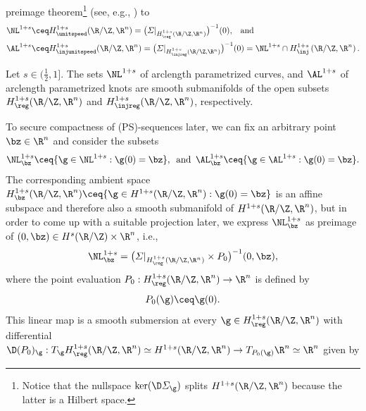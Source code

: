 preimage theorem\footnote{Notice that the nullspace $\ker(\D\varSigma_\g)$
splits $H^{1+s}(\R/\Z,\R^n)$ because the latter is a Hilbert space.}
(see, e.g., \cite[Theorem 4.J]{zeidler_1993}) 
to
\begin{equation}
\begin{aligned}
	\label{eq:arclength-manifold}
&\NL^{1+s}\ceq H^{1+s}_\unitspeed(\R/\Z,\R^n)=\big(\varSigma|_{H^{1+s}_\reg(\R/\Z,\R^n)}
\big)^{-1}(0),\hspace{5pt}\text{ and }\\
&\AL^{1+s} \ceq H^{1+s}_\injunitspeed(\R/\Z,\R^n)=\big(\varSigma|_{H^{1+s}_\injreg(\R/\Z,\R^n)}\big)^{-1}(0)=\NL^{1+s}\cap H^{1+s}_\inj\left( \R/\Z,\R^n \right).
\end{aligned}
\end{equation}

\begin{theorem}
\label{thm:arclength-manifold}
Let $s\in (\frac{1}{2},1]$.
The sets $\NL^{1+s}$ of arclength para\-met\-rized curves, and $\AL^{1+s}$ of arclength para\-met\-rized knots are smooth submanifolds
of the open subsets $H^{1+s}_\reg(\R/\Z,\R^n)$ and $ H^{1+s}_\injreg(\R/\Z,\R^n) $, respectively. 
\end{theorem}
To secure compactness of (PS)-sequences  later,
we can fix an arbitrary 
point $\bz\in\R^n$ and
consider the subsets
\begin{equation}\label{eq:arclenth-point}
\NL^{1+s}_\bz\ceq\{\g\in\NL^{1+s}:\g(0)=\bz\},\, \text{ and }\,\AL^{1+s}_\bz\ceq\{\g\in\AL^{1+s}:\g(0)=\bz\}.
\end{equation}
The corresponding ambient space $H^{1+s}_\bz(\R/\Z,\R^n)\ceq\{\g\in
H^{1+s}(\R/\Z,\R^n):\g(0)=\bz\}$ is an affine subspace
and therefore also a smooth submanifold of $H^{1+s}(\R/\Z,\R^n)$, but in order
to come up with a suitable projection later, we express $\NL^{1+s}_\bz$ as
preimage of $(0,\bz)\in H^s(\R/\Z)\times\R^n$, i.e., 
\begin{align*}\label{eq:NL_z-preimage}
	\NL^{1+s}_\bz=\big(
\varSigma|_{H^{1+s}_\reg(\R/\Z,\R^n)}\times P_0\big)^{-1}(0,\bz),
\end{align*}
where the point evaluation $P_0:H^{1+s}_\reg(\R/\Z,\R^n)\to\R^n$ is 
defined by
\begin{equation}\label{eq:point-evaluation}
P_0(\g)\ceq\g(0).
\end{equation}
This linear map is a smooth submersion at every $\g\in H^{1+s}_\reg(\R/\Z,\R^n)$
with differential $\D(P_0)_\g:T_\g H^{1+s}_\reg(\R/\Z,\R^n)\simeq
H^{1+s}(\R/\Z,\R^n)\to T_{P_0(\g)}\R ^n\simeq \R^n$  given by
